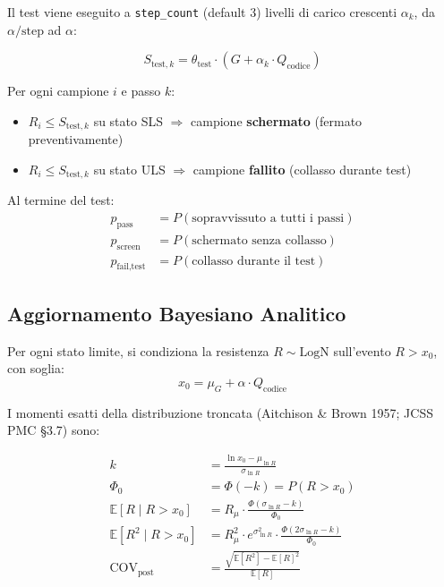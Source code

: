 \documentclass[11pt,a4paper]{article}
\begin{document}
Il test viene eseguito a \texttt{step\_count} (default 3) livelli di carico crescenti $\alpha_k$, da $\alpha/\text{step}$ ad $\alpha$:

\begin{equation}
  S_{\text{test},k} = \theta_{\text{test}} \cdot (G + \alpha_k \cdot Q_{\text{codice}})
\end{equation}

Per ogni campione $i$ e passo $k$:
\begin{itemize}
  \item $R_i \leq S_{\text{test},k}$ su stato SLS $\Rightarrow$ campione \textbf{schermato} (fermato preventivamente)
  \item $R_i \leq S_{\text{test},k}$ su stato ULS $\Rightarrow$ campione \textbf{fallito} (collasso durante test)
\end{itemize}

Al termine del test:
\begin{align}
  p_{\text{pass}} &= P(\text{sopravvissuto a tutti i passi}) \\
  p_{\text{screen}} &= P(\text{schermato senza collasso}) \\
  p_{\text{fail,test}} &= P(\text{collasso durante il test})
\end{align}

\subsection{Aggiornamento Bayesiano Analitico}

Per ogni stato limite, si condiziona la resistenza $R \sim \text{LogN}$ sull'evento $R > x_0$, con soglia:
\begin{equation}
  x_0 = \mu_G + \alpha \cdot Q_{\text{codice}}
\end{equation}

I momenti esatti della distribuzione troncata (Aitchison \& Brown 1957; JCSS PMC \S3.7) sono:

\begin{align}
  k &= \frac{\ln x_0 - \mu_{\ln R}}{\sigma_{\ln R}} \\
  \Phi_0 &= \Phi(-k) = P(R > x_0) \\
  \mathbb{E}[R \mid R > x_0] &= R_\mu \cdot \frac{\Phi(\sigma_{\ln R} - k)}{\Phi_0} \\
  \mathbb{E}[R^2 \mid R > x_0] &= R_\mu^2 \cdot e^{\sigma_{\ln R}^2} \cdot \frac{\Phi(2\sigma_{\ln R} - k)}{\Phi_0} \\
  \text{COV}_{\text{post}} &= \frac{\sqrt{\mathbb{E}[R^2] - \mathbb{E}[R]^2}}{\mathbb{E}[R]}
\end{align}
\end{document}
